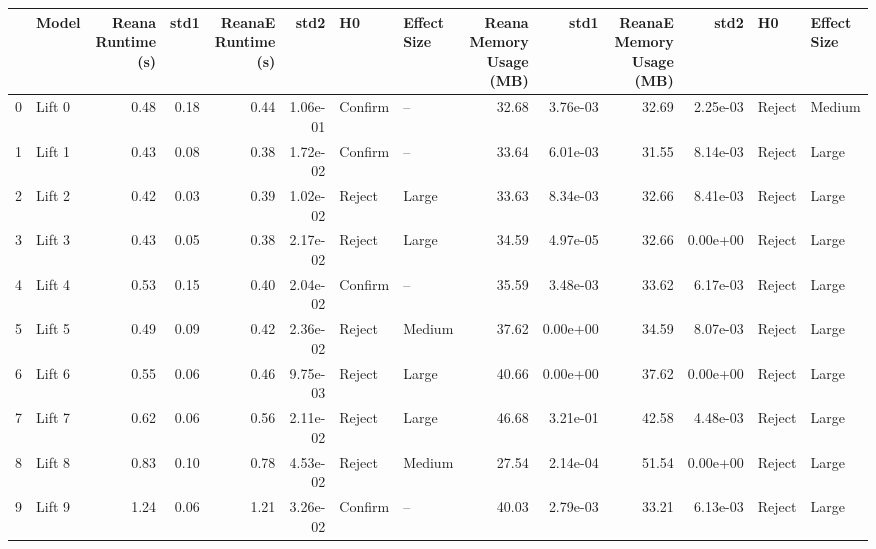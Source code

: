 \begin{tabular}{llrrrrllrrrrll}
\toprule
{} &    Model &  Reana Runtime (s) &  std1 &  ReanaE Runtime (s) &      std2 &       H0 & Effect Size &  Reana Memory Usage (MB) &      std1 &  ReanaE Memory Usage (MB) &      std2 &       H0 & Effect Size \\
\midrule
0  &   Lift 0 &               0.48 &  0.18 &                0.44 &  1.06e-01 &  Confirm &          -- &                    32.68 &  3.76e-03 &                     32.69 &  2.25e-03 &   Reject &      Medium \\
1  &   Lift 1 &               0.43 &  0.08 &                0.38 &  1.72e-02 &  Confirm &          -- &                    33.64 &  6.01e-03 &                     31.55 &  8.14e-03 &   Reject &       Large \\
2  &   Lift 2 &               0.42 &  0.03 &                0.39 &  1.02e-02 &   Reject &       Large &                    33.63 &  8.34e-03 &                     32.66 &  8.41e-03 &   Reject &       Large \\
3  &   Lift 3 &               0.43 &  0.05 &                0.38 &  2.17e-02 &   Reject &       Large &                    34.59 &  4.97e-05 &                     32.66 &  0.00e+00 &   Reject &       Large \\
4  &   Lift 4 &               0.53 &  0.15 &                0.40 &  2.04e-02 &  Confirm &          -- &                    35.59 &  3.48e-03 &                     33.62 &  6.17e-03 &   Reject &       Large \\
5  &   Lift 5 &               0.49 &  0.09 &                0.42 &  2.36e-02 &   Reject &      Medium &                    37.62 &  0.00e+00 &                     34.59 &  8.07e-03 &   Reject &       Large \\
6  &   Lift 6 &               0.55 &  0.06 &                0.46 &  9.75e-03 &   Reject &       Large &                    40.66 &  0.00e+00 &                     37.62 &  0.00e+00 &   Reject &       Large \\
7  &   Lift 7 &               0.62 &  0.06 &                0.56 &  2.11e-02 &   Reject &       Large &                    46.68 &  3.21e-01 &                     42.58 &  4.48e-03 &   Reject &       Large \\
8  &   Lift 8 &               0.83 &  0.10 &                0.78 &  4.53e-02 &   Reject &      Medium &                    27.54 &  2.14e-04 &                     51.54 &  0.00e+00 &   Reject &       Large \\
9  &   Lift 9 &               1.24 &  0.06 &                1.21 &  3.26e-02 &  Confirm &          -- &                    40.03 &  2.79e-03 &                     33.21 &  6.13e-03 &   Reject &       Large \\

\end{tabular}
